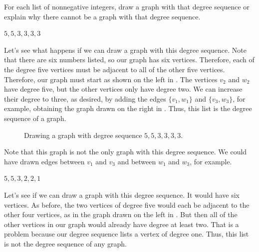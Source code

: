 \begin{exam}
\label{exam_graphical}
   For each list of nonnegative integers, draw a graph with that degree sequence or explain why there cannot be a graph with that degree sequence.
       \begin{apart}
           \item $5, 5, 3, 3, 3, 3$
               \begin{soln}
                   Let's see what happens if we can draw a graph with this degree sequence.  Note that there are six numbers listed, so our graph has six vertices.  Therefore, each of the degree five vertices must be adjacent to all of the other five vertices.  Therefore, our graph must start as shown on the left in .  The vertices $v_2$ and $w_2$ have degree five, but the other vertices only have degree two.  We can increase their degree to three, as desired, by adding the edges $\{v_1,w_1\}$ and $\{v_3,w_3\}$, for example, obtaining the graph drawn on the right in .  Thus, this list is the degree sequence of a graph.
                       \begin{figure}[htbp]
                           \centering
                           
                           \caption{Drawing a graph with degree sequence $5, 5, 3, 3, 3, 3$.}
                           \label{fig_graphical}
                        \end{figure}
                    Note that this graph is not the only graph with this degree sequence.  We could have drawn edges between $v_1$ and $v_3$ and between $w_1$ and $w_3$, for example.
               \end{soln}
            \item $5, 5, 3, 2, 2, 1$
                \begin{soln}
                    Let's see if we can draw a graph with this degree sequence.  It would have six vertices.  As before, the two vertices of degree five would each be adjacent to the other four vertices, as in the graph drawn on the left in .  But then all of the other vertices in our graph would already have degree at least two.  That is a problem because our degree sequence lists a vertex of degree one. Thus, this list is not the degree sequence of any graph.
                \end{soln}
       \end{apart}
\end{exam}


